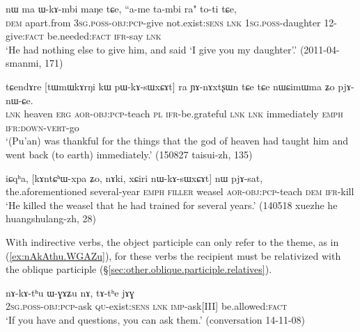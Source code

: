 \begin{exe}
\ex \label{ex:WkAmbi.maNe}
\gll nɯ ma ɯ-kɤ-mbi maŋe tɕe, ``a-me ta-mbi ra" to-ti tɕe, \\
\textsc{dem} apart.from \textsc{3sg}.\textsc{poss}-\textsc{obj}:\textsc{pcp}-give not.exist:\textsc{sens} \textsc{lnk} \textsc{1sg}.\textsc{poss}-daughter 1\fl{}2-give:\textsc{fact}  be.needed:\textsc{fact} \textsc{ifr}-say \textsc{lnk} \\
\glt `He had nothing else to give him, and said `I give you my daughter'.' (2011-04-smanmi, 171)
\end{exe}

\begin{exe}
\ex \label{ex:pWkAsWxCAt.nWra}
\gll   tɕendɤre [tɯmɯkɤrŋi kɯ pɯ-kɤ-sɯxɕɤt] ra ɲɤ-nɤxtʂɯn tɕe tɕe nɯɕimɯma ʑo pjɤ-nɯ-ɕe. \\
\textsc{lnk} heaven \textsc{erg} \textsc{aor}-\textsc{obj}:\textsc{pcp}-teach \textsc{pl} \textsc{ifr}-be.grateful \textsc{lnk} \textsc{lnk} immediately \textsc{emph} \textsc{ifr}:\textsc{down}-\textsc{vert}-go \\
\glt `(Pu'an) was thankful for the things that the god of heaven had taught him and went back (to earth) immediately.' (150827 taisui-zh, 135)
\end{exe}

\begin{exe}
\ex \label{ex:xCiri.nWkAsWxCAt}
\gll    iɕqʰa, [kɤntɕʰɯ-xpa ʑo, nɤki, xɕiri nɯ-kɤ-sɯxɕɤt] nɯ pjɤ-sat, \\
 the.aforementioned several-year \textsc{emph} \textsc{filler} weasel \textsc{aor}-\textsc{obj}:\textsc{pcp}-teach \textsc{dem} \textsc{ifr}-kill \\
\glt `He killed the weasel that he had trained for several years.'  (140518 xuezhe he huangshulang-zh, 28)
\end{exe}

With indirective verbs, the object participle can only refer to the theme, as in (\ref{ex:nAkAthu.WGAZu}), for these verbs the recipient must be relativized with the oblique participle  (§\ref{sec:other.oblique.participle.relatives}).

\begin{exe}
\ex \label{ex:nAkAthu.WGAZu}
\gll nɤ-kɤ-tʰu ɯ-ɣɤʑu nɤ, tɤ-tʰe jɤɣ \\
\textsc{2sg}.\textsc{poss}-\textsc{obj}:\textsc{pcp}-ask \textsc{qu}-exist:\textsc{sens} \textsc{lnk} \textsc{imp}-ask[III] be.allowed:\textsc{fact} \\
\glt `If you have and questions, you can ask them.' (conversation 14-11-08)
\end{exe}

